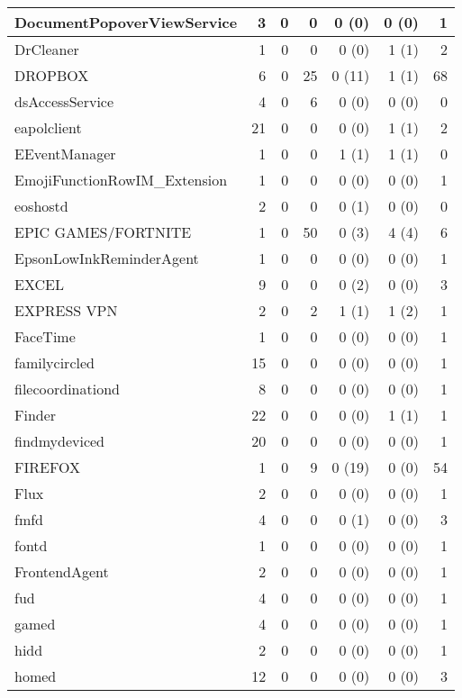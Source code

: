 \begin{adjustwidth}{-2in}{}
\begin{scriptsize}
\begin{longtable}[l]{ l | r | r | r | r | r | r }
    DocumentPopoverViewService & 3 &  0 &  0 &  0 (0) &  0 (0) &  1 \\ \hline
    DrCleaner &  1 &  0 &  0 &  0 (0) &  1 (1) &  2 \\ \hline
    DROPBOX &  6 &  0 & 25 & 0 (11) &  1 (1) & 68 \\ \hline
    dsAccessService &  4 &  0 &  6 &  0 (0) &  0 (0) &  0 \\ \hline
    eapolclient & 21 &  0 &  0 &  0 (0) &  1 (1) &  2 \\ \hline
    EEventManager &  1 &  0 &  0 &  1 (1) &  1 (1) &  0 \\ \hline
    EmojiFunctionRowIM\_Extension & 1 &  0 &  0 &  0 (0) &  0 (0) &  1 \\ \hline
    eoshostd & 2 &  0 &  0 &  0 (1) &  0 (0) &  0 \\ \hline
    EPIC GAMES/FORTNITE &  1 &  0 & 50 &  0 (3) &  4 (4) &  6 \\ \hline
    EpsonLowInkReminderAgent & 1 &  0 &  0 &  0 (0) &  0 (0) &  1 \\ \hline
    EXCEL &  9 &  0 &  0 &  0 (2) &  0 (0) &  3 \\ \hline
    EXPRESS VPN &  2 &  0 &  2 &  1 (1) &  1 (2) &  1 \\ \hline
    FaceTime & 1 &  0 &  0 &  0 (0) &  0 (0) &  1 \\ \hline
    familycircled & 15 &  0 &  0 &  0 (0) &  0 (0) &  1 \\ \hline
    filecoordinationd &  8 &  0 &  0 &  0 (0) &  0 (0) &  1 \\ \hline
    Finder &  22 &  0 &  0 &  0 (0) &  1 (1) &  1 \\ \hline
    findmydeviced & 20 &  0 &  0 &  0 (0) &  0 (0) &  1 \\ \hline
    FIREFOX &  1 &  0 &  9 & 0 (19) &  0 (0) & 54 \\ \hline
    Flux & 2 &  0 &  0 &  0 (0) &  0 (0) &  1 \\ \hline
    fmfd & 4 &  0 &  0 &  0 (1) &  0 (0) &  3 \\ \hline
    fontd &  1 &  0 &  0 &  0 (0) &  0 (0) &  1 \\ \hline
    FrontendAgent &  2 &  0 &  0 &  0 (0) &  0 (0) &  1 \\ \hline
    fud &  4 &  0 &  0 &  0 (0) &  0 (0) &  1 \\ \hline
    gamed &  4 &  0 &  0 &  0 (0) &  0 (0) &  1 \\ \hline
    hidd & 2 &  0 &  0 &  0 (0) &  0 (0) &  1 \\ \hline
    homed & 12 &  0 &  0 &  0 (0) &  0 (0) &  3 \\ \hline

\end{longtable}
\end{scriptsize}
\end{adjustwidth}
